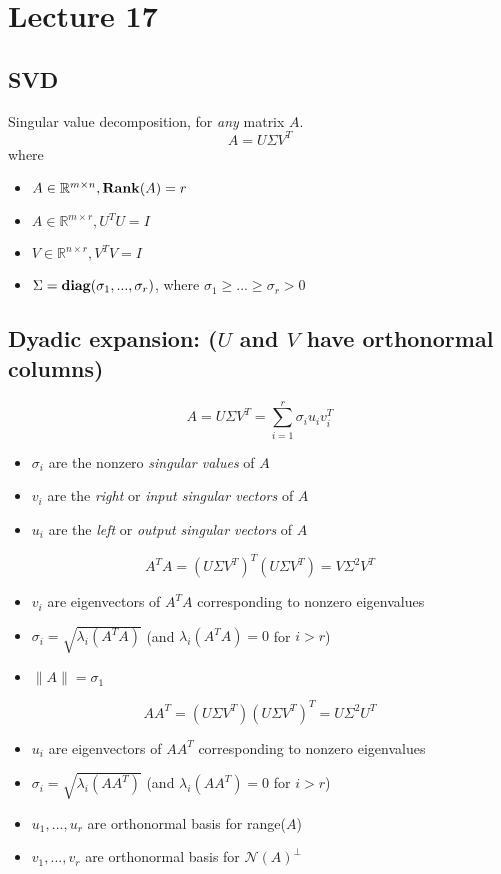 \documentclass[10pt,letterpaper]{article}
\begin{document}
\section{Lecture 17}
\label{sec-16}
\subsection{SVD}
\label{sec-16_1}

Singular value decomposition, for \emph{any} matrix $A$.
$$
A = U\Sigma V ^{T}
$$
where 
\begin{itemize}
\item $A \in \mathbb{R}^{m\times n}, {\bf Rank} (A) = r$
\item $A \in \mathbb{R}^{m\times r}, U ^{T} U = I$
\item $V \in \mathbb{R}^{n\times r}, V ^{T} V = I$
\item $\Sigma = {\bf diag} (\sigma _{1} ,..., \sigma _{r} )$, where $\sigma _{1} \ge ... \ge \sigma _{r} > 0$
\end{itemize}
\subsection{Dyadic expansion: ($U$ and $V$ have orthonormal columns)}
\label{sec-16_2}

$$
A = U \Sigma V ^{T} = \sum ^{r} _{i=1} \sigma _{i} u _{i} v _{i} ^{T} 
$$
\begin{itemize}
\item $\sigma _{i}$ are the nonzero \emph{singular values} of $A$
\item $v_i$ are the \emph{right} or \emph{input singular vectors} of $A$
\item $u _{i}$ are the \emph{left} or \emph{output singular vectors} of $A$
\end{itemize}
$$
A ^{T} A = (U \Sigma V ^{T} )^{T} (U \Sigma V ^{T}) = V \Sigma ^{2} V ^{T} 
$$
\begin{itemize}
\item $v _{i}$ are eigenvectors of $A ^{T}A$ corresponding to nonzero eigenvalues
\item $\sigma _{i} = \sqrt{\lambda _{i} (A ^{T} A) }$ (and $\lambda _{i} (A ^{T} A) = 0$ for $i>r$)
\item $\|A\| = \sigma _{1}$
\end{itemize}
$$
AA ^{T} = (U \Sigma V ^{T} ) (U \Sigma V ^{T} )^{T} = U \Sigma ^{2} U ^{T} 
$$
\begin{itemize}
\item $u _{i}$ are eigenvectors of $AA ^{T}$ corresponding to nonzero eigenvalues
\item $\sigma _{i} = \sqrt{\lambda _{i} (AA ^{T}) }$ (and $\lambda _{i} (AA ^{T}) = 0$ for $i>r$)
\item $u _{1} ,..., u _{r}$ are orthonormal basis for range($A$)
\item $v _{1} ,..., v _{r}$ are orthonormal basis for $\mathcal{N}(A) ^{\perp}$
\end{itemize}
\end{document}
